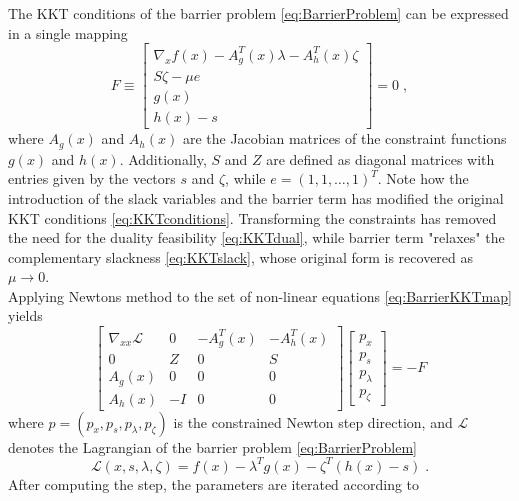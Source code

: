 The KKT conditions of the barrier problem \eqref{eq:BarrierProblem} can be expressed in a single mapping 
\begin{equation}
	F \equiv 
	\begin{bmatrix}
  \nabla_x f(x) - A_{g}^{T}(x) \lambda  - A_{h}^{T}(x) \zeta \\
  S \zeta - \mu e \\
  g(x)		\\
  h(x) - s 
  \end{bmatrix}
  = 0 \; ,
  \label{eq:BarrierKKTmap}
\end{equation}
where $A_g (x)$ and $A_h (x)$ are the Jacobian matrices of the constraint functions $g(x)$ and $h(x)$. Additionally, $S$ and $Z$ are defined as diagonal matrices with entries given by the vectors $s$ and $\zeta$, while $e = (1 ,1 , \ldots , 1 )^T$. Note how the introduction of the slack variables and the barrier term has modified the original KKT conditions \eqref{eq:KKTconditions}. Transforming the constraints has removed the need for the duality feasibility \eqref{eq:KKTdual}, while barrier term "relaxes" the complementary slackness \eqref{eq:KKTslack}, whose original form is recovered as $\mu \to 0$.\\
Applying Newtons method to the set of non-linear equations \eqref{eq:BarrierKKTmap} yields
\begin{equation}
  \begin{bmatrix}
  \nabla_{xx} \mathcal{L} 	& 0 	& -A_{g}^{T}(x)	& -A_{h}^{T}(x)	\\
  0 						& Z 	& 0 			& S 			\\
  A_{g}(x) 					& 0 	& 0 			& 0				\\
  A_{h}(x) 					& -I	& 0				& 0				 
  \end{bmatrix}  
  \begin{bmatrix}
  p_x \\ p_s \\ p_{\lambda} \\ p_{\zeta} 
  \end{bmatrix}
  = - F
  \label{eq:ConNewtonMethod}
\end{equation}
where $p = ( p_x , p_s , p_{\lambda} , p_{\zeta} )$ is the constrained Newton step direction, and $\mathcal{L}$ denotes the Lagrangian of the barrier problem \eqref{eq:BarrierProblem}
\begin{equation}
	\mathcal{L}(x,s,\lambda,\zeta) = f(x) - \lambda^T g(x) - \zeta^T ( h(x) - s)  \; .
\end{equation}
After computing the step, the parameters are iterated according to 
